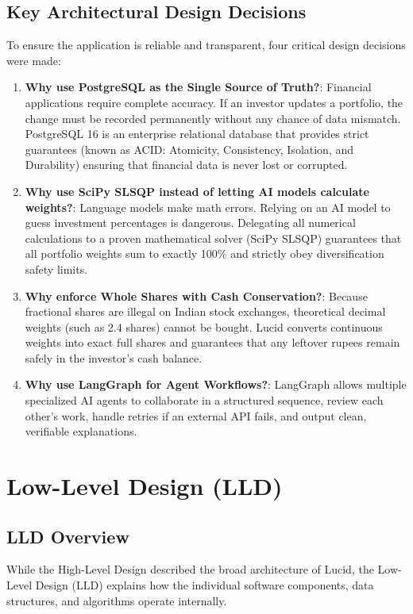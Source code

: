 \subsection{Key Architectural Design Decisions}
To ensure the application is reliable and transparent, four critical design decisions were made:
\begin{enumerate}
    \item \textbf{Why use PostgreSQL as the Single Source of Truth?}: Financial applications require complete accuracy. If an investor updates a portfolio, the change must be recorded permanently without any chance of data mismatch. PostgreSQL 16 is an enterprise relational database that provides strict guarantees (known as ACID: Atomicity, Consistency, Isolation, and Durability) ensuring that financial data is never lost or corrupted.
    \item \textbf{Why use SciPy SLSQP instead of letting AI models calculate weights?}: Language models make math errors. Relying on an AI model to guess investment percentages is dangerous. Delegating all numerical calculations to a proven mathematical solver (SciPy SLSQP) guarantees that all portfolio weights sum to exactly 100\% and strictly obey diversification safety limits.
    \item \textbf{Why enforce Whole Shares with Cash Conservation?}: Because fractional shares are illegal on Indian stock exchanges, theoretical decimal weights (such as 2.4 shares) cannot be bought. Lucid converts continuous weights into exact full shares and guarantees that any leftover rupees remain safely in the investor's cash balance.
    \item \textbf{Why use LangGraph for Agent Workflows?}: LangGraph allows multiple specialized AI agents to collaborate in a structured sequence, review each other's work, handle retries if an external API fails, and output clean, verifiable explanations.
\end{enumerate}

\section{Low-Level Design (LLD)}
\label{sec:lld}

\subsection{LLD Overview}
While the High-Level Design described the broad architecture of Lucid, the Low-Level Design (LLD) explains how the individual software components, data structures, and algorithms operate internally. 

